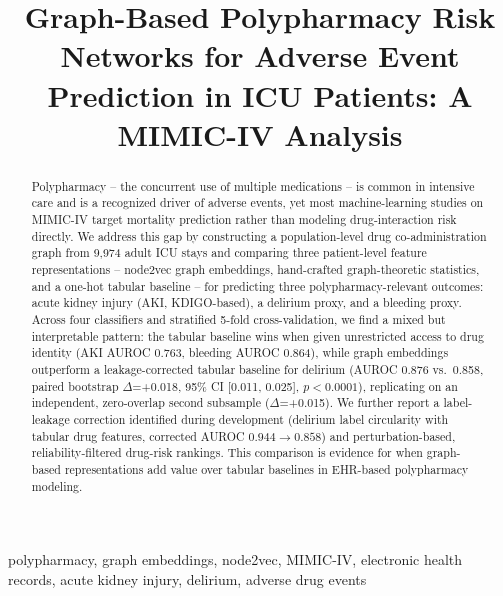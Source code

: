 \documentclass[conference]{IEEEtran}
\begin{document}
\title{Graph-Based Polypharmacy Risk Networks for Adverse Event Prediction in ICU Patients: A MIMIC-IV Analysis}

\author{
}

\maketitle

\begin{abstract}
Polypharmacy -- the concurrent use of multiple medications -- is common in
intensive care and is a recognized driver of adverse events, yet most
machine-learning studies on MIMIC-IV target mortality prediction rather than
modeling drug-interaction risk directly. We address this gap by constructing
a population-level drug co-administration graph from 9{,}974 adult ICU stays
and comparing three patient-level feature representations -- node2vec graph
embeddings, hand-crafted graph-theoretic statistics, and a one-hot tabular
baseline -- for predicting three polypharmacy-relevant outcomes: acute kidney
injury (AKI, KDIGO-based), a delirium proxy, and a bleeding proxy. Across four
classifiers and stratified 5-fold cross-validation, we find a mixed but
interpretable pattern: the tabular baseline wins when given unrestricted
access to drug identity (AKI AUROC 0.763, bleeding AUROC 0.864), while graph
embeddings outperform a leakage-corrected tabular baseline for delirium
(AUROC 0.876 vs.\ 0.858, paired bootstrap $\Delta$=+0.018, 95\% CI
[0.011, 0.025], $p<0.0001$), replicating on an independent, zero-overlap
second subsample ($\Delta$=+0.015). We further report a label-leakage
correction identified during development (delirium label circularity with
tabular drug features, corrected AUROC $0.944 \rightarrow 0.858$) and
perturbation-based, reliability-filtered drug-risk rankings. This comparison
is evidence for when graph-based representations add value over tabular
baselines in EHR-based polypharmacy modeling.
\end{abstract}

\begin{IEEEkeywords}
polypharmacy, graph embeddings, node2vec, MIMIC-IV, electronic health records, acute kidney injury, delirium, adverse drug events
\end{IEEEkeywords}
\end{document}
